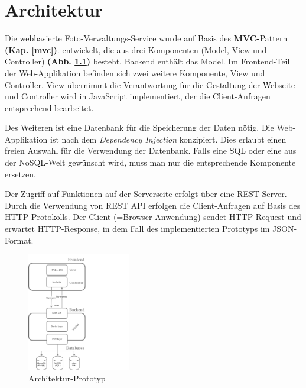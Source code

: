 \chapter{Architektur}

Die webbasierte Foto-Verwaltungs-Service wurde auf Basis des \textbf{MVC-}Pattern \textbf{(Kap. \ref{mvc})}. entwickelt, die aus drei Komponenten (Model, View und Controller) \textbf{(Abb. \ref{img:architectureMyApp})} besteht. Backend enthält das Model. Im Frontend-Teil der Web-Applikation befinden sich zwei weitere Komponente, View und Controller. View übernimmt die Verantwortung für die Gestaltung der Webseite und Controller wird in JavaScript implementiert, der die Client-Anfragen entsprechend bearbeitet.

Des Weiteren ist eine Datenbank für die Speicherung der Daten nötig. Die Web-Applikation ist nach dem \textit{Dependency Injection} konzipiert. Dies erlaubt einen freien Auswahl für die Verwendung der Datenbank. Falls eine SQL oder eine aus der NoSQL-Welt gewünscht wird, muss man nur die entsprechende Komponente ersetzen.

Der Zugriff auf Funktionen auf der Serverseite erfolgt über eine REST Server. Durch die Verwendung von REST API erfolgen die Client-Anfragen auf Basis des HTTP-Protokolls. Der Client (=Browser Anwendung) sendet HTTP-Request und erwartet HTTP-Response, in dem Fall des implementierten Prototyps im JSON-Format.

\begin{figure}[H]
\centering
\includegraphics[trim = 0mm 0mm 0mm 0mm, clip, width=0.4\textwidth]{resources/architectureMyAppWithoutFrameworks}
\caption[Architektur-Prototyp]{Architektur-Prototyp}
\label{img:architectureMyApp}
\end{figure}

